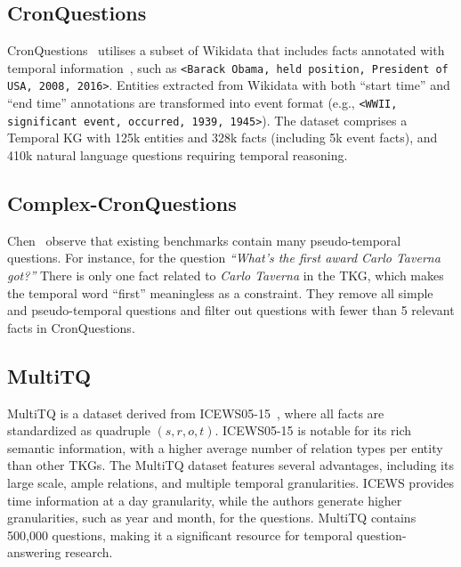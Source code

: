 \subsection{\textbf{CronQuestions}}CronQuestions~\cite{chenTemporalKnowledgeGraph2022} utilises a subset of Wikidata that includes facts annotated with temporal information~\cite{lacroixTensorDecompositionsTemporal2020}, such as \texttt{<Barack Obama, held position, President of USA, 2008, 2016>}. Entities extracted from Wikidata with both ``start time'' and ``end time'' annotations are transformed into event format (e.g., \texttt{<WWII, significant event, occurred, 1939, 1945>}). 
The dataset comprises a Temporal KG with 125k entities and 328k facts (including 5k event facts), and 410k natural language questions requiring temporal reasoning.


\subsection{\textbf{Complex-CronQuestions}}
Chen~\cite{chenTemporalKnowledgeGraph2022} observe that existing benchmarks contain many pseudo-temporal questions. For instance, for the question \textit{``What’s the first award Carlo Taverna got?''} There is only one fact related to\textit{ Carlo Taverna} in the TKG, which makes the temporal word ``first'' meaningless as a constraint. 
They remove all simple and pseudo-temporal questions and filter out questions with fewer than 5 relevant facts in CronQuestions.


\subsection{\textbf{MultiTQ}}MultiTQ \cite{chenMultigranularityTemporalQuestion2023} is a dataset derived from ICEWS05-15~\cite{garcia-duranLearningSequenceEncoders2018}, where all facts are standardized as quadruple $(s,r,o,t)$.
ICEWS05-15 is notable for its rich semantic information, with a higher average number of relation types per entity than other TKGs.
The MultiTQ dataset features several advantages, including its large scale, ample relations, and multiple temporal granularities.
ICEWS provides time information at a day granularity, while the authors generate higher granularities, such as year and month, for the questions. MultiTQ contains 500,000 questions, making it a significant resource for temporal question-answering research.

